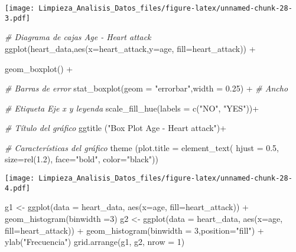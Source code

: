 \documentclass[
]{article}
\newenvironment{Shaded}{\begin{snugshade}}{\end{snugshade}}
\newcommand{\AttributeTok}[1]{\textcolor[rgb]{0.77,0.63,0.00}{#1}}
\newcommand{\CommentTok}[1]{\textcolor[rgb]{0.56,0.35,0.01}{\textit{#1}}}
\newcommand{\DecValTok}[1]{\textcolor[rgb]{0.00,0.00,0.81}{#1}}
\newcommand{\FloatTok}[1]{\textcolor[rgb]{0.00,0.00,0.81}{#1}}
\newcommand{\FunctionTok}[1]{\textcolor[rgb]{0.00,0.00,0.00}{#1}}
\newcommand{\NormalTok}[1]{#1}
\newcommand{\OtherTok}[1]{\textcolor[rgb]{0.56,0.35,0.01}{#1}}
\newcommand{\SpecialCharTok}[1]{\textcolor[rgb]{0.00,0.00,0.00}{#1}}
\newcommand{\StringTok}[1]{\textcolor[rgb]{0.31,0.60,0.02}{#1}}
\begin{document}
\texttt{[image: Limpieza\_Analisis\_Datos\_files/figure-latex/unnamed-chunk-28-3.pdf]}

\begin{Shaded}
\begin{Highlighting}[]
\CommentTok{\# Diagrama de cajas Age {-} Heart attack}
\FunctionTok{ggplot}\NormalTok{(heart\_data,}\FunctionTok{aes}\NormalTok{(}\AttributeTok{x=}\NormalTok{heart\_attack,}\AttributeTok{y=}\NormalTok{age, }\AttributeTok{fill=}\NormalTok{heart\_attack)) }\SpecialCharTok{+}
  

  \FunctionTok{geom\_boxplot}\NormalTok{() }\SpecialCharTok{+}
  
  \CommentTok{\# Barras de error}
  \FunctionTok{stat\_boxplot}\NormalTok{(}\AttributeTok{geom =} \StringTok{"errorbar"}\NormalTok{,}\AttributeTok{width =} \FloatTok{0.25}\NormalTok{) }\SpecialCharTok{+} \CommentTok{\# Ancho}
  
  \CommentTok{\# Etiqueta Eje x y leyenda}
  \FunctionTok{scale\_fill\_hue}\NormalTok{(}\AttributeTok{labels =} \FunctionTok{c}\NormalTok{(}\StringTok{"NO"}\NormalTok{, }\StringTok{"YES"}\NormalTok{))}\SpecialCharTok{+}
  
  \CommentTok{\# Título del gráfico}
  \FunctionTok{ggtitle}\NormalTok{ (}\StringTok{"Box Plot Age {-} Heart attack"}\NormalTok{)}\SpecialCharTok{+}
   
  \CommentTok{\# Características del gráfico}
    \FunctionTok{theme}\NormalTok{ (}\AttributeTok{plot.title =} \FunctionTok{element\_text}\NormalTok{(}
        \AttributeTok{hjust =} \FloatTok{0.5}\NormalTok{,}
        \AttributeTok{size=}\FunctionTok{rel}\NormalTok{(}\FloatTok{1.2}\NormalTok{),}
        \AttributeTok{face=}\StringTok{"bold"}\NormalTok{, }
        \AttributeTok{color=}\StringTok{"black"}\NormalTok{))}
\end{Highlighting}
\end{Shaded}

\texttt{[image: Limpieza\_Analisis\_Datos\_files/figure-latex/unnamed-chunk-28-4.pdf]}

\begin{Shaded}
\begin{Highlighting}[]
\NormalTok{g1 }\OtherTok{\textless{}{-}} \FunctionTok{ggplot}\NormalTok{(}\AttributeTok{data =}\NormalTok{ heart\_data, }\FunctionTok{aes}\NormalTok{(}\AttributeTok{x=}\NormalTok{age, }\AttributeTok{fill=}\NormalTok{heart\_attack)) }\SpecialCharTok{+} \FunctionTok{geom\_histogram}\NormalTok{(}\AttributeTok{binwidth =}\DecValTok{3}\NormalTok{)}
\NormalTok{g2 }\OtherTok{\textless{}{-}} \FunctionTok{ggplot}\NormalTok{(}\AttributeTok{data =}\NormalTok{ heart\_data, }\FunctionTok{aes}\NormalTok{(}\AttributeTok{x=}\NormalTok{age, }\AttributeTok{fill=}\NormalTok{heart\_attack)) }\SpecialCharTok{+} \FunctionTok{geom\_histogram}\NormalTok{(}\AttributeTok{binwidth =} \DecValTok{3}\NormalTok{,}\AttributeTok{position=}\StringTok{"fill"}\NormalTok{) }\SpecialCharTok{+} \FunctionTok{ylab}\NormalTok{(}\StringTok{"Frecuencia"}\NormalTok{)}
\FunctionTok{grid.arrange}\NormalTok{(g1, g2, }\AttributeTok{nrow =} \DecValTok{1}\NormalTok{)}
\end{Highlighting}
\end{Shaded}
\end{document}
